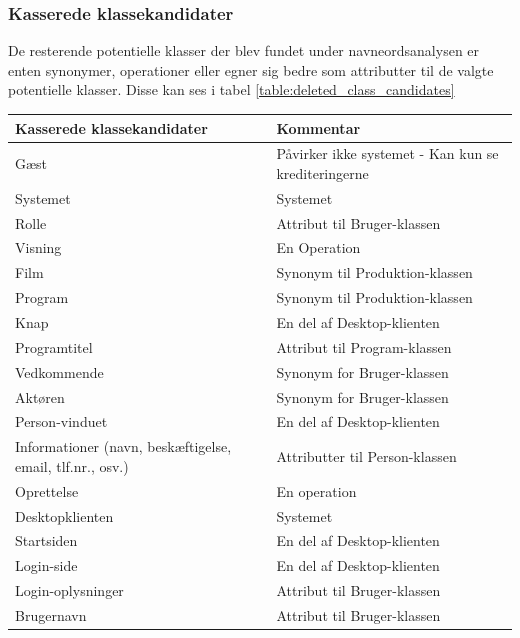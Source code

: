 \subsubsection{Kasserede klassekandidater}
De resterende potentielle klasser der blev fundet under navneordsanalysen er enten synonymer, operationer eller egner sig bedre som attributter til de valgte potentielle klasser. Disse kan ses i tabel \ref{table:deleted_class_candidates}

\begin{table}[H]
    \begin{tabularx}{\textwidth}{|X|X|}
        \hline
        \textbf{Kasserede klassekandidater} & \textbf{Kommentar} \\
        \hline
        Gæst & Påvirker ikke systemet - Kan kun se krediteringerne\\
        \hline
        Systemet & Systemet  \\
        \hline
        Rolle   & Attribut til Bruger-klassen\\
        \hline
        Visning  & En Operation\\
        \hline
        Film & Synonym til Produktion-klassen\\ 
        \hline
        Program & Synonym til Produktion-klassen\\ 
        \hline
        Knap & En del af Desktop-klienten\\
        \hline
        Programtitel & Attribut til Program-klassen\\
        \hline
        Vedkommende & Synonym for Bruger-klassen\\
        \hline
        Aktøren &  Synonym for Bruger-klassen\\
        \hline
        Person-vinduet & En del af Desktop-klienten\\
        \hline
        Informationer (navn, beskæftigelse, email, tlf.nr., osv.) &  Attributter til Person-klassen\\
        \hline
        Oprettelse & En operation \\
        \hline
        Desktopklienten &  Systemet\\
        \hline
        Startsiden &  En del af Desktop-klienten\\
        \hline
        Login-side & En del af Desktop-klienten\\
        \hline
        Login-oplysninger & Attribut til Bruger-klassen\\
        \hline
        Brugernavn & Attribut til Bruger-klassen\\

\end{tabularx}
\end{table}
